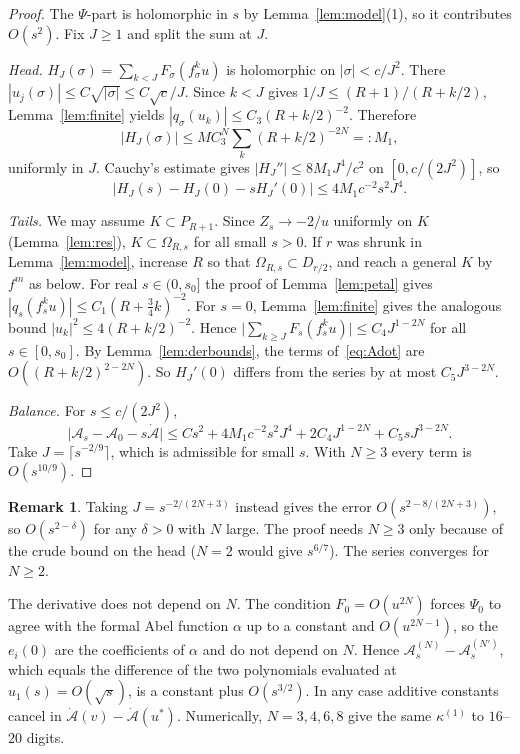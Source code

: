 \documentclass[11pt]{amsart}
\theoremstyle{definition}
\newtheorem{remark}[theorem]{Remark}
\begin{document}
\begin{proof}
The $\Psi$-part is holomorphic in $s$ by Lemma~\ref{lem:model}(1), so it
contributes $O(s^2)$.  Fix $J\ge1$ and split the sum at $J$.

\emph{Head.}  $H_J(\sigma)=\sum_{k<J}F_\sigma(f_\sigma^ku)$ is holomorphic on
$|\sigma|<c/J^2$.  There $|u_j(\sigma)|\le C\sqrt{|\sigma|}\le C\sqrt c/J$.
Since $k<J$ gives $1/J\le(R+1)/(R+k/2)$, Lemma~\ref{lem:finite} yields
$|q_\sigma(u_k)|\le C_3(R+k/2)^{-2}$.  Therefore
\[
 |H_J(\sigma)|\le MC_3^N\sum_k(R+k/2)^{-2N}=:M_1,
\]
uniformly in $J$.  Cauchy's estimate gives $|H_J''|\le8M_1J^4/c^2$ on
$[0,c/(2J^2)]$, so
\[
 |H_J(s)-H_J(0)-sH_J'(0)|\le4M_1c^{-2}s^2J^4 .
\]

\emph{Tails.}  We may assume $K\subset P_{R+1}$.  Since $Z_s\to-2/u$ uniformly
on $K$ (Lemma~\ref{lem:res}), $K\subset\Omega_{R,s}$ for all small $s>0$.  If $r$
was shrunk in Lemma~\ref{lem:model}, increase $R$ so that
$\Omega_{R,s}\subset D_{r/2}$, and reach a general $K$ by $f^m$ as below.  For
real $s\in(0,s_0]$ the proof of Lemma~\ref{lem:petal} gives
$|q_s(f_s^ku)|\le C_1(R+\tfrac34k)^{-2}$.  For $s=0$, Lemma~\ref{lem:finite}
gives the analogous bound $|u_k|^2\le4(R+k/2)^{-2}$.  Hence
$\bigl|\sum_{k\ge J}F_s(f_s^ku)\bigr|\le C_4J^{1-2N}$ for all $s\in[0,s_0]$.
By Lemma~\ref{lem:derbounds}, the terms of~\eqref{eq:Adot} are
$O((R+k/2)^{2-2N})$.  So $H_J'(0)$ differs from the series by at most
$C_5J^{3-2N}$.

\emph{Balance.}  For $s\le c/(2J^2)$,
\[
 \bigl|\mathcal A_s-\mathcal A_0-s\dot{\mathcal A}\bigr|
 \le Cs^2+4M_1c^{-2}s^2J^4+2C_4J^{1-2N}+C_5sJ^{3-2N}.
\]
Take $J=\lceil s^{-2/9}\rceil$, which is admissible for small $s$.  With
$N\ge3$ every term is $O(s^{10/9})$.
\end{proof}

\begin{remark}
Taking $J=s^{-2/(2N+3)}$ instead gives the error $O(s^{2-8/(2N+3)})$, so
$O(s^{2-\delta})$ for any $\delta>0$ with $N$ large.  The proof needs $N\ge3$
only because of the crude bound on the head ($N=2$ would give $s^{6/7}$).  The
series converges for $N\ge2$.

The derivative does not depend on $N$.  The condition $F_0=O(u^{2N})$ forces
$\Psi_0$ to agree with the formal Abel function $\alpha$ up to a constant and
$O(u^{2N-1})$, so the $e_i(0)$ are the coefficients of $\alpha$ and do not depend
on $N$.  Hence $\mathcal A^{(N)}_s-\mathcal A^{(N')}_s$, which equals the
difference of the two polynomials evaluated at $u_1(s)=O(\sqrt s)$, is a
constant plus $O(s^{3/2})$.  In any case additive constants cancel in
$\dot{\mathcal A}(v)-\dot{\mathcal A}(u^*)$.  Numerically, $N=3,4,6,8$ give the
same $\kappa^{(1)}$ to $16$--$20$ digits.
\end{remark}
\end{document}
